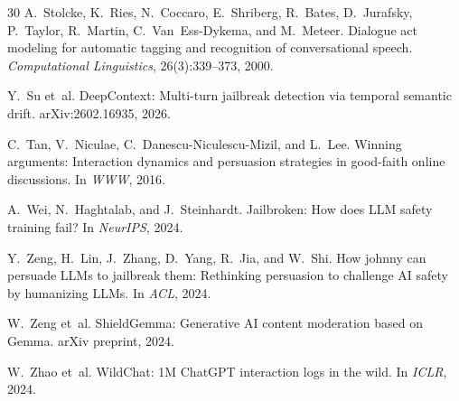 \documentclass[11pt,a4paper]{article}
\begin{document}
\begin{thebibliography}{30}
A.~Stolcke, K.~Ries, N.~Coccaro, E.~Shriberg, R.~Bates, D.~Jurafsky, P.~Taylor, R.~Martin, C.~Van~Ess-Dykema, and M.~Meteer.
\newblock Dialogue act modeling for automatic tagging and recognition of conversational speech.
\newblock \emph{Computational Linguistics}, 26(3):339--373, 2000.

Y.~Su et~al.
\newblock DeepContext: Multi-turn jailbreak detection via temporal semantic drift.
\newblock arXiv:2602.16935, 2026.

C.~Tan, V.~Niculae, C.~Danescu-Niculescu-Mizil, and L.~Lee.
\newblock Winning arguments: Interaction dynamics and persuasion strategies in good-faith online discussions.
\newblock In \emph{WWW}, 2016.

A.~Wei, N.~Haghtalab, and J.~Steinhardt.
\newblock Jailbroken: How does LLM safety training fail?
\newblock In \emph{NeurIPS}, 2024.

Y.~Zeng, H.~Lin, J.~Zhang, D.~Yang, R.~Jia, and W.~Shi.
\newblock How johnny can persuade LLMs to jailbreak them: Rethinking persuasion to challenge AI safety by humanizing LLMs.
\newblock In \emph{ACL}, 2024.

W.~Zeng et~al.
\newblock ShieldGemma: Generative AI content moderation based on Gemma.
\newblock arXiv preprint, 2024.

W.~Zhao et~al.
\newblock WildChat: 1M ChatGPT interaction logs in the wild.
\newblock In \emph{ICLR}, 2024.

\end{thebibliography}
\end{document}
